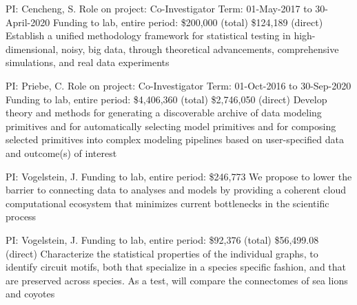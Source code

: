 \documentclass[10pt,colorlinks=true,urlcolor=blue]{moderncv}
\begin{document}
{\newline PI: Cencheng, S.
\newline Role on project: Co-Investigator
\newline Term: 01-May-2017 to 30-April-2020
\newline Funding to lab, entire period: \$200,000 (total) \$124,189 (direct)
\newline Establish a unified methodology framework for statistical testing in high-dimensional, noisy,
big data, through theoretical advancements, comprehensive simulations, and real data
experiments}{}{}{}

{\newline PI: Priebe, C.
\newline Role on project: Co-Investigator
\newline Term: 01-Oct-2016 to 30-Sep-2020
\newline Funding to lab, entire period: \$4,406,360 (total) \$2,746,050 (direct)
\newline Develop theory and methods for generating a discoverable archive of data modeling
primitives and for automatically selecting model primitives and for composing selected primitives into complex
modeling pipelines based on user-specified data and outcome(s) of interest}{}{}{}

{\newline PI: Vogelstein, J.
\newline Funding to lab, entire period: \$246,773
\newline We propose to lower the barrier to connecting data to analyses and models by providing a coherent cloud computational ecosystem that minimizes current bottlenecks in the scientific process}{}{}{}

{\newline PI: Vogelstein, J. 
\newline Funding to lab, entire period: \$92,376 (total) \$56,499.08 (direct)
\newline Characterize the statistical properties of the individual graphs, to identify circuit motifs,
both that specialize in a species specific fashion, and that are preserved across species.
As a test, will compare the connectomes of sea lions and coyotes}{}{}{}
\end{document}

